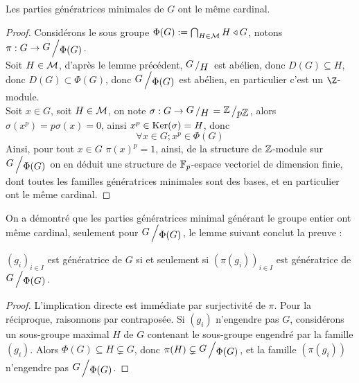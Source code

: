 \begin{thm}
	Les parties génératrices minimales de $G$ ont le même cardinal.
\end{thm}
\begin{proof}
	Considérons le sous groupe $\Phi(G) := \bigcap_{H\in \mathcal{M}} H \triangleleft G$, notons $\pi : G \to \bigslant{G}{\Phi(G)}$. \\
	Soit $ H\in \mathcal{M}$, d'après le lemme précédent, $\bigslant{G}{H}$ est abélien, donc $D(G) \subseteq H$, donc $D(G) \subset \Phi(G)$, donc $\bigslant{G}{\Phi(G)}$ est abélien, en particulier c'est un $\Z$-module. \\
	Soit $x\in G$, soit $H\in \mathcal{M}$, on note $\sigma : G \to \bigslant{G}{H} = \bigslant{\bZ}{p\bZ}$, alors $\sigma(x^p) = p \sigma(x) = 0$, ainsi $x^p \in \textup{Ker}(\sigma) = H$, donc 
	\begin{equation*} \forall x \in G; x^p \in \Phi(G) \end{equation*} 
	\noindent Ainsi, pour tout $x \in G$ $\pi(x)^p = 1$, ainsi, de la structure de $\mathbb{Z}$-module sur $\bigslant{G}{\Phi(G)}$ on en déduit une structure de $\mathbb{F}_p$-espace vectoriel de dimension finie, dont toutes les familles génératrices minimales sont des bases, et en particulier ont le même cardinal.
\end{proof}

On a démontré que les parties génératrices minimal générant le groupe entier ont même cardinal, seulement pour $\bigslant{G}{\Phi(G)}$, le lemme suivant conclut la preuve :

\begin{lem}
	$(g_i)_{i\in I}$ est génératrice de $G$ si et seulement si $(\pi(g_i))_{i \in I}$ est génératrice de $\bigslant{G}{\Phi(G)}$.
\end{lem}
\begin{proof}
	L'implication directe est immédiate par surjectivité de $\pi$. Pour la réciproque, raisonnons par contraposée. Si $(g_i)$ n'engendre pas $G$, considérons un sous-groupe maximal $H$ de $G$ contenant le sous-groupe engendré par la famille $(g_i)$. Alors $\Phi(G) \subseteq H \subsetneq G$, donc $\pi(H) \subsetneq \bigslant{G}{\Phi(G)}$, et la famille $(\pi(g_i))$ n'engendre pas $\bigslant{G}{\Phi(G)}$.
\end{proof}




